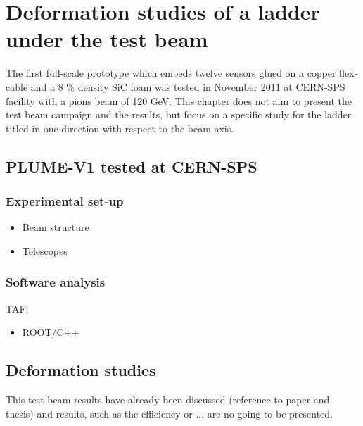 \chapter{Deformation studies of a ladder under the test beam}

  The first full-scale prototype which embeds twelve sensors glued on a copper flex-cable and a 8 \% density \gls{SiC} foam was tested in November 2011 at CERN-SPS facility with a pions beam of 120 GeV.
  This chapter does not aim to present the test beam campaign and the results, but focus on a specific study for the ladder titled in one direction with respect to the beam axis.
  
  \minitoc

  \section{PLUME-V1 tested at CERN-SPS}
    \subsection{Experimental set-up}

     \begin{itemize}
       \item Beam structure
       \item Telescopes
     \end{itemize}

    \begin{figure}
    \end{figure}

    \subsection{Software analysis}

      TAF:
      \begin{itemize}
        \item ROOT/C++
      \end{itemize}

  \section{Deformation studies}
    
    This test-beam results have already been discussed (reference to paper and thesis) and results, such as the efficiency or ... are no going to be presented.

    \begin{figure}
    \end{figure}


